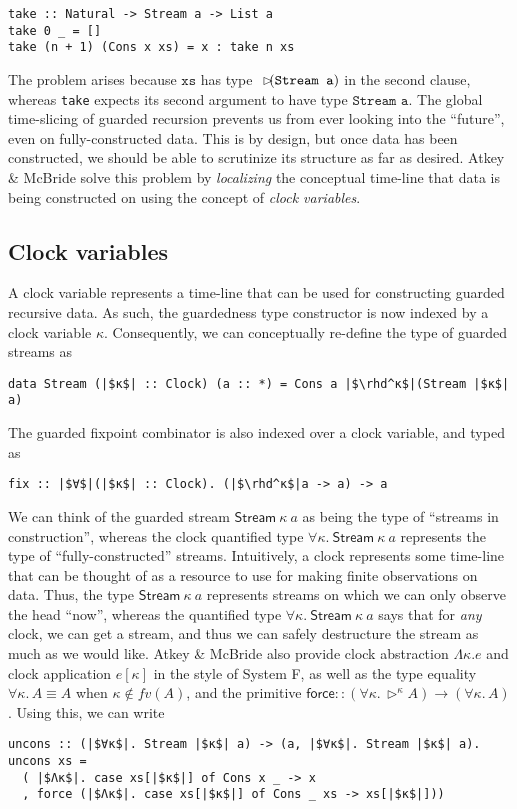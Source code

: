 \documentclass[sigplan,9pt,review]{acmart}\settopmatter{printfolios=true,printccs=false,printacmref=false}
\newcommand{\code}[1]{\texttt{#1}}
\begin{document}
\begin{verbatim}
take :: Natural -> Stream a -> List a
take 0 _ = []
take (n + 1) (Cons x xs) = x : take n xs
\end{verbatim}

The problem arises because $\code{xs}$ has type $\later (\code{Stream a})$ in
the second clause,
whereas \code{take} expects its second argument to have type $\code{Stream a}$.
The global time-slicing of guarded recursion prevents us from ever looking into the ``future'',
even on fully-constructed data. This is by design, but once data has been constructed, we should
be able to scrutinize its structure as far as desired. Atkey \& McBride \cite{atkey2013productive} solve this
problem by \textit{localizing} the conceptual time-line that data is being constructed on
using the concept of \textit{clock variables}.

\subsection{Clock variables}
A clock variable represents a time-line that can be used for constructing guarded recursive
data. As such, the guardedness type constructor is now indexed by a clock variable $κ$.
Consequently, we can conceptually re-define the type of guarded streams as
\begin{verbatim}
data Stream (|$κ$| :: Clock) (a :: *) = Cons a |$\rhd^κ$|(Stream |$κ$| a)
\end{verbatim}

The guarded fixpoint combinator is also indexed over a clock variable, and typed as

\begin{verbatim}
fix :: |$∀$|(|$κ$| :: Clock). (|$\rhd^κ$|a -> a) -> a
\end{verbatim}

We can think of the guarded stream $\mathsf{Stream}\ κ\ a$ as being the type of ``streams in
construction'', whereas the clock quantified type $∀κ.\ \mathsf{Stream}\ κ\ a$ represents the
type of ``fully-constructed'' streams. Intuitively, a clock represents some time-line that
can be thought of as a resource to use for making finite observations on data. Thus, the
type $\mathsf{Stream}\ κ\ a$ represents streams on which we can only observe the head ``now'',
whereas the quantified type $∀κ.\ \mathsf{Stream}\ κ\ a$ says that for \textit{any} clock,
we can get a stream, and thus we can safely destructure the stream as much as we would like.
Atkey \& McBride \cite{atkey2013productive} also provide clock abstraction $Λκ. e$ and clock application
$e[κ]$ in the style of System F, as well as the type equality $∀κ.\, A ≡ A$ when $κ ∉ fv(A)$,
and the primitive $\mathsf{force} :: (∀κ.\, \rhd^κ A) → (∀κ.\, A)$. Using this, we can
write
\begin{verbatim}
uncons :: (|$∀κ$|. Stream |$κ$| a) -> (a, |$∀κ$|. Stream |$κ$| a).
uncons xs =
  ( |$Λκ$|. case xs[|$κ$|] of Cons x _ -> x
  , force (|$Λκ$|. case xs[|$κ$|] of Cons _ xs -> xs[|$κ$|]))
\end{verbatim}
\end{document}
